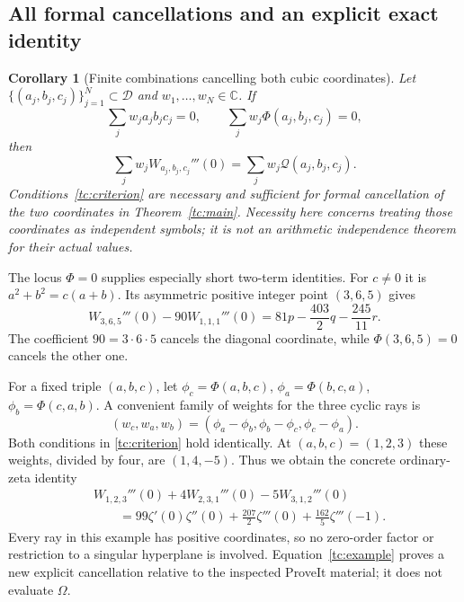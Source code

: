 \documentclass[11pt,a4paper]{article}
\numberwithin{equation}{section}
\theoremstyle{plain}
\newtheorem{corollary}[theorem]{Corollary}
\theoremstyle{definition}
\theoremstyle{remark}
\begin{document}
\subsection{All formal cancellations and an explicit exact identity}

\begin{corollary}[Finite combinations cancelling both cubic coordinates]
\label{tc:cancellation}
Let $\{(a_j,b_j,c_j)\}_{j=1}^N\subset\mathscr D$ and
$w_1,\ldots,w_N\in\mathbb C$.  If
\begin{equation}
 \sum_jw_j a_jb_jc_j=0,\qquad
 \sum_jw_j\Phi(a_j,b_j,c_j)=0,
 \label{tc:criterion}
\end{equation}
then
\begin{equation}
 \sum_jw_jW_{a_j,b_j,c_j}'''(0)
       =\sum_jw_j\mathscr Q(a_j,b_j,c_j).
 \label{tc:cancelled}
\end{equation}
Conditions~\eqref{tc:criterion} are necessary and sufficient for
formal cancellation of the two coordinates in
Theorem~\ref{tc:main}.  Necessity here concerns treating those
coordinates as independent symbols; it is not an arithmetic
independence theorem for their actual values.
\end{corollary}

The locus $\Phi=0$ supplies especially short two-term identities.
For $c\ne0$ it is $a^2+b^2=c(a+b)$.  Its asymmetric positive
integer point $(3,6,5)$ gives
\begin{equation}
 \boxed{\displaystyle
 W_{3,6,5}'''(0)-90W_{1,1,1}'''(0)
   =81p-\frac{403}{2}q-\frac{245}{11}r.}
 \label{tc:two-ray-example}
\end{equation}
The coefficient $90=3\cdot6\cdot5$ cancels the diagonal
coordinate, while $\Phi(3,6,5)=0$ cancels the other one.

For a fixed triple $(a,b,c)$, let
$\phi_c=\Phi(a,b,c)$, $\phi_a=\Phi(b,c,a)$,
$\phi_b=\Phi(c,a,b)$.  A convenient family of weights for the three
cyclic rays is
\[
 (w_c,w_a,w_b)=(\phi_a-\phi_b,\phi_b-\phi_c,\phi_c-\phi_a).
\]
Both conditions in \eqref{tc:criterion} hold identically.
At $(a,b,c)=(1,2,3)$ these weights, divided by four, are $(1,4,-5)$.
Thus we obtain the concrete ordinary-zeta identity
\begin{equation}
 \boxed{\begin{aligned}
 &W_{1,2,3}'''(0)+4W_{2,3,1}'''(0)-5W_{3,1,2}'''(0)\\
 &\qquad=99\zeta'(0)\zeta''(0)
       +\frac{207}{2}\zeta'''(0)
       +\frac{162}{5}\zeta'''(-1).
 \end{aligned}}
 \label{tc:example}
\end{equation}
Every ray in this example has positive coordinates, so no zero-order
factor or restriction to a singular hyperplane is involved.
Equation~\eqref{tc:example} proves a new explicit cancellation relative
to the inspected ProveIt material; it does not evaluate $\Omega$.
\end{document}
